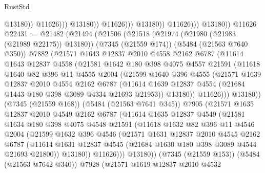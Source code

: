 \begin{lexlean}{RustStd}
\begin{coremodule}
                                      @13180))
                                  @11626)))
                            @13180))
                        @11626)))
                  @13180))
              @11626)))
        @13180))
    @11626
@22431 := @21482
    (@21494
      (@21506
        (@21518
          (@21974 (@21980 (@21983 (@21989 @22175)) @13180))
          (@7345 (@21559 @174))
          (@5484 (@21563 @7640 @350))
          @7882
          (@21571
            @1643
            @12837
            @2010
            @4558
            @2162
            @6787
            (@11614
              @1643
              @12837
              @4558
              (@21581
                @1642
                @180
                @398
                @4075
                @4557
                @21591
                (@11618
                  @1640
                  @82
                  @396
                  @11
                  @4555
                  @2004
                  (@21599
                    @1640
                    @396
                    @4555
                    (@21571
                      @1639
                      @12837
                      @2010
                      @4554
                      @2162
                      @6787
                      (@11614 @1639 @12837 @4554 (@21684 @1443 @180 @398 @3089 @4334 @21693 @21953))
                      @13180))
                  @11626)))
            @13180))
        (@7345 (@21559 @168))
        (@5484 (@21563 @7641 @345))
        @7905
        (@21571
          @1635
          @12837
          @2010
          @4549
          @2162
          @6787
          (@11614
            @1635
            @12837
            @4549
            (@21581
              @1634
              @180
              @398
              @4075
              @4548
              @21591
              (@11618
                @1632
                @82
                @396
                @11
                @4546
                @2004
                (@21599
                  @1632
                  @396
                  @4546
                  (@21571
                    @1631
                    @12837
                    @2010
                    @4545
                    @2162
                    @6787
                    (@11614 @1631 @12837 @4545 (@21684 @1630 @180 @398 @3089 @4544 @21693 @21800))
                    @13180))
                @11626)))
          @13180))
      (@7345 (@21559 @153))
      (@5484 (@21563 @7642 @340))
      @7928
      (@21571
        @1619
        @12837
        @2010
        @4532

\end{coremodule}
\end{lexlean}
